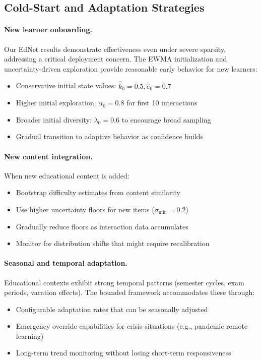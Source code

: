 \subsection{Cold-Start and Adaptation Strategies}
\label{app:cold-start-strategies}

\paragraph{New learner onboarding.} Our EdNet results demonstrate effectiveness even under severe sparsity, addressing a critical deployment concern. The EWMA initialization and uncertainty-driven exploration provide reasonable early behavior for new learners:
\begin{itemize}
  \item Conservative initial state values: $\widehat{k}_0 = 0.5, \widehat{e}_0 = 0.7$
  \item Higher initial exploration: $\alpha_0 = 0.8$ for first 10 interactions
  \item Broader initial diversity: $\lambda_0 = 0.6$ to encourage broad sampling
  \item Gradual transition to adaptive behavior as confidence builds
\end{itemize}

\paragraph{New content integration.} When new educational content is added:
\begin{itemize}
  \item Bootstrap difficulty estimates from content similarity
  \item Use higher uncertainty floors for new items ($\sigma_{\min} = 0.2$)
  \item Gradually reduce floors as interaction data accumulates
  \item Monitor for distribution shifts that might require recalibration
\end{itemize}

\paragraph{Seasonal and temporal adaptation.} Educational contexts exhibit strong temporal patterns (semester cycles, exam periods, vacation effects). The bounded framework accommodates these through:
\begin{itemize}
  \item Configurable adaptation rates that can be seasonally adjusted
  \item Emergency override capabilities for crisis situations (e.g., pandemic remote learning)
  \item Long-term trend monitoring without losing short-term responsiveness
\end{itemize}


